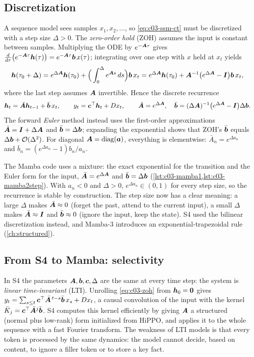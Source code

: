 \subsection{Discretization}

A sequence model sees samples $x_1,x_2,\dots$, so \cref{eq:c03-ssm-ct} must be discretized with
a step size $\Delta>0$. The \emph{zero-order hold} (ZOH) assumes the input is constant between
samples. Multiplying the ODE by $e^{-\bm{A}\tau}$ gives
$\frac{d}{d\tau}\big(e^{-\bm{A}\tau}\bm{h}(\tau)\big)=e^{-\bm{A}\tau}\bm{b}\,x(\tau)$; integrating over one
step with $x$ held at $x_t$ yields
\[
  \bm{h}(\tau_0+\Delta)=e^{\Delta\bm{A}}\bm{h}(\tau_0)+\Big(\int_0^{\Delta}e^{\bm{A} s}\,ds\Big)\bm{b}\,x_t
  =e^{\Delta\bm{A}}\bm{h}(\tau_0)+\bm{A}^{-1}\big(e^{\Delta\bm{A}}-\bm{I}\big)\bm{b}\,x_t ,
\]
where the last step assumes $\bm{A}$ invertible. Hence the discrete recurrence
\begin{equation}\label{eq:c03-zoh}
  \bm{h}_t=\bar{\bm{A}}\bm{h}_{t-1}+\bar{\bm{b}}\,x_t,\qquad y_t=\bm{c}^{\top}\bm{h}_t+Dx_t,\qquad
  \bar{\bm{A}}=e^{\Delta\bm{A}},\quad \bar{\bm{b}}=(\Delta\bm{A})^{-1}\big(e^{\Delta\bm{A}}-\bm{I}\big)\Delta\bm{b} .
\end{equation}
The forward \emph{Euler} method instead uses the first-order approximations
$\bar{\bm{A}}=\bm{I}+\Delta\bm{A}$ and $\bar{\bm{b}}=\Delta\bm{b}$; expanding the exponential shows that ZOH's
$\bar{\bm{b}}$ equals $\Delta\bm{b}+\mathcal{O}(\Delta^2)$. For diagonal $\bm{A}=\operatorname{diag}(\bm{a})$, everything is
elementwise: $\bar A_n=e^{\Delta a_n}$ and $\bar b_n=(e^{\Delta a_n}-1)b_n/a_n$.

The Mamba code uses a mixture: the exact exponential for the transition and the Euler form for
the input, $\bar{\bm{A}}=e^{\Delta\bm{A}}$ and $\bar{\bm{b}}=\Delta\bm{b}$ (\cref{lst:c03-mamba1,lst:c03-mamba2step}).
With $a_n<0$ and $\Delta>0$, $e^{\Delta a_n}\in(0,1)$ for every step size, so the recurrence is
stable by construction. The step size now has a clear meaning: a large $\Delta$ makes
$\bar{\bm{A}}\approx0$ (forget the past, attend to the current input), a small $\Delta$ makes
$\bar{\bm{A}}\approx\bm{I}$ and $\bar{\bm{b}}\approx0$ (ignore the input, keep the state). S4 used the
bilinear discretization instead, and Mamba-3 introduces an exponential-trapezoidal rule
(\cref{ch:structured}).

\subsection{From S4 to Mamba: selectivity}

In S4 \citep{c03-gu2022s4} the parameters $\bm{A},\bm{b},\bm{c},\Delta$ are the same at every time step:
the system is \emph{linear time-invariant} (LTI). Unrolling \cref{eq:c03-zoh} from $\bm{h}_0=\bm0$
gives $y_t=\sum_{s\le t}\bm{c}^{\top}\bar{\bm{A}}^{\,t-s}\bar{\bm{b}}\,x_s+Dx_t$, a causal convolution of the input
with the kernel $\bar K_j=\bm{c}^{\top}\bar{\bm{A}}^{j}\bar{\bm{b}}$. S4 computes this kernel efficiently by
giving $\bm{A}$ a structured (normal plus low-rank) form initialized from HiPPO, and applies it to
the whole sequence with a fast Fourier transform. The weakness of LTI models is that every token
is processed by the same dynamics: the model cannot decide, based on content, to ignore a filler
token or to store a key fact.

